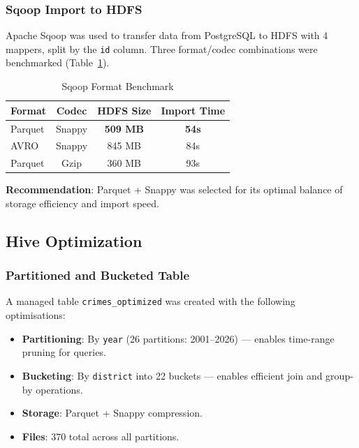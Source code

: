 \subsubsection{Sqoop Import to HDFS}

Apache Sqoop was used to transfer data from PostgreSQL to HDFS with 4 mappers, split by the \texttt{id} column. Three format/codec combinations were benchmarked (Table~\ref{tab:sqoop-benchmark}).

\begin{table}[H]
\centering
\caption{Sqoop Format Benchmark}
\label{tab:sqoop-benchmark}
\begin{tabular}{lccc}
\toprule
\textbf{Format} & \textbf{Codec} & \textbf{HDFS Size} & \textbf{Import Time} \\
\midrule
Parquet & Snappy & \textbf{509 MB} & \textbf{54s} \\
AVRO & Snappy & 845 MB & 84s \\
Parquet & Gzip & 360 MB & 93s \\
\bottomrule
\end{tabular}
\end{table}

\textbf{Recommendation}: Parquet + Snappy was selected for its optimal balance of storage efficiency and import speed.

\subsection{Hive Optimization}

\subsubsection{Partitioned and Bucketed Table}

A managed table \texttt{crimes\_optimized} was created with the following optimisations:

\begin{itemize}
    \item \textbf{Partitioning}: By \texttt{year} (26 partitions: 2001--2026) — enables time-range pruning for queries.
    \item \textbf{Bucketing}: By \texttt{district} into 22 buckets — enables efficient join and group-by operations.
    \item \textbf{Storage}: Parquet + Snappy compression.
    \item \textbf{Files}: 370 total across all partitions.
\end{itemize}

